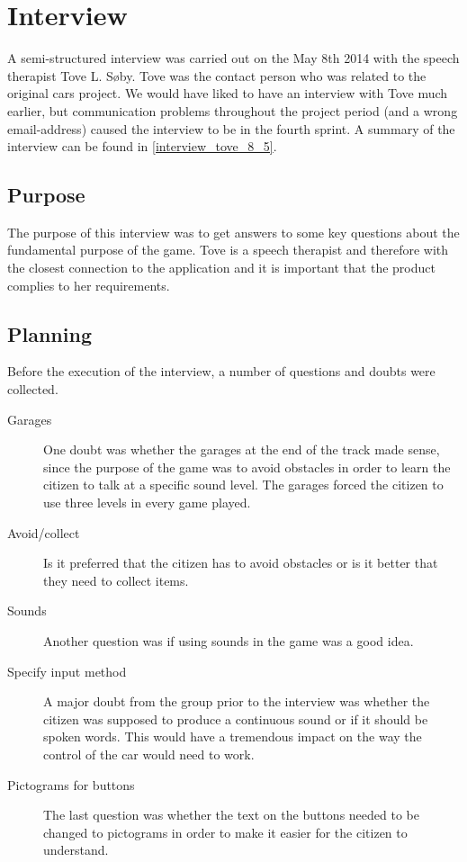 \section{Interview}\label{s4_interview}

A semi-structured interview \cite{deb} was carried out on the May 8th 2014 with the speech therapist Tove L. Søby.
Tove was the contact person who was related to the original cars project.\cite{oldcars}
We would have liked to have an interview with Tove much earlier, but communication problems throughout the project period (and a wrong email-address) caused the interview to be in the fourth sprint.
A summary of the interview can be found in \cref{interview_tove_8_5}.

\subsection{Purpose}
The purpose of this interview was to get answers to some key questions about the fundamental purpose of the game. 
Tove is a speech therapist and therefore with the closest connection to the application and it is important that the product complies to her requirements.

\subsection{Planning}
Before the execution of the interview, a number of questions and doubts were collected.

\begin{description}
\item[Garages] One doubt was whether the garages at the end of the track made sense, since the purpose of the game was to avoid obstacles in order to learn the citizen to talk at a specific sound level.
The garages forced the citizen to use three levels in every game played.

\item[Avoid/collect] Is it preferred that the citizen has to avoid obstacles or is it better that they need to collect items. 

\item[Sounds] Another question was if using sounds in the game was a good idea.

\item[Specify input method] A major doubt from the group prior to the interview was whether the citizen was supposed to produce a continuous sound or if it should be spoken words.
This would have a tremendous impact on the way the control of the car would need to work.

\item[Pictograms for buttons] The last question was whether the text on the buttons needed to be changed to pictograms in order to make it easier for the citizen to understand.
\end{description}

